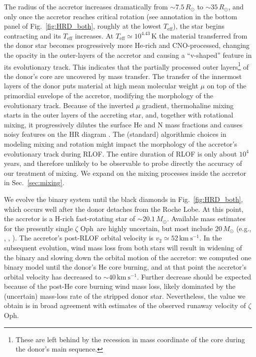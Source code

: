 \documentclass[twocolumn,twocolappendix,trackchanges]{aastex63}
\newcommand{\kms}{{\mathrm{km\ s^{-1}}}}
\DeclareRobustCommand{\Figref}[1]{Fig.~\ref{#1}}
\DeclareRobustCommand{\Secref}[1]{Sec.~\ref{#1}}
\newcommand{\zoph}{$\zeta$ Oph}
\begin{document}
The radius of the accretor increases dramatically from
$\sim7.5\,R_\odot$ to $\sim35\,R_\odot$, and only once the accretor
reaches critical rotation (see annotation in the bottom panel of
\Figref{fig:HRD_both}, roughly at the lowest $T_\mathrm{eff}$), the star begins
contracting and its $T_\mathrm{eff}$ increases. At
$T_\mathrm{eff}\simeq 10^{4.43}$\,K the material transferred from the
donor star becomes progressively more He-rich and CNO-processed,
changing the opacity in the outer-layers of the accretor and
causing a ``v-shaped'' feature in its evolutionary
track. This
indicates that the partially processed outer layers\footnote{These are
  left behind by the recession in mass coordinate of the core
during the donor's main sequence.} of the donor's
core are uncovered by mass
transfer. %
The transfer of the innermost layers of the donor puts material at
high mean molecular weight $\mu$ on top of the primordial envelope of
the accretor, modifying the morphology of the evolutionary
track. Because of the inverted $\mu$ gradient, thermohaline mixing
starts in the outer layers of the accreting star, and, together with
rotational mixing, it progressively dilutes the surface He and N mass
fractions and causes noisy features on the HR diagram
\citep[e.g.,][]{cantiello:07}. The (standard) algorithmic choices in
modeling mixing and rotation might impact the morphology of the
accretor's evolutionary track during RLOF. The entire duration of RLOF
is only about $10^4$\,years, and therefore unlikely to be observable
to probe directly the accuracy of our treatment of mixing. We expand
on the mixing processes inside the accretor in \Secref{sec:mixing}.

We evolve the binary system until the black diamonds in
\Figref{fig:HRD_both}, which occurs well after the donor detaches from
the Roche Lobe. At this point, the accretor is a H-rich fast-rotating
star of
$\sim$$20.1\,M_\odot$. Available mass estimates for the presently single \zoph\ are highly uncertain, but most include
$20\,M_\odot$ (e.g., \citealt{hoogerwerf:01}, , \citealt{neuhauser:20}). The accretor's post-RLOF orbital velocity is
$v_2\simeq52\,\kms$. In the subsequent evolution, wind mass loss from both stars will result in  widening of the binary and slowing down the orbital motion of the accretor: we computed one binary model until the donor's He core burning, and at that point the accretor's orbital velocity has decreased to
$\sim$$40\,\kms$. Further decrease should be expected because of the
post-He core burning wind mass loss, likely dominated by the
(uncertain) mass-loss rate of the stripped donor star. Nevertheless,
the value we obtain is in broad agreement with estimates of the
observed runaway velocity of \zoph.
\end{document}
